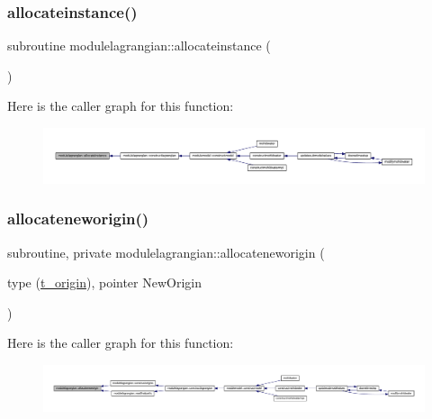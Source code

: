\subsubsection{\texorpdfstring{allocateinstance()}{allocateinstance()}}
{\footnotesize\ttfamily subroutine modulelagrangian\+::allocateinstance (\begin{DoxyParamCaption}{ }\end{DoxyParamCaption})\hspace{0.3cm}{\ttfamily [private]}}

Here is the caller graph for this function\+:\nopagebreak
\begin{figure}[H]
\begin{center}
\leavevmode
\includegraphics[width=350pt]{namespacemodulelagrangian_a8223a77ae9396e4ded8f6f220eb1ebe0_icgraph}
\end{center}
\end{figure}
\mbox{\label{namespacemodulelagrangian_a28216eb4bc7ae29253535daa2e07a0ae}} 
\subsubsection{\texorpdfstring{allocateneworigin()}{allocateneworigin()}}
{\footnotesize\ttfamily subroutine, private modulelagrangian\+::allocateneworigin (\begin{DoxyParamCaption}\item[{type (\mbox{\hyperlink{structmodulelagrangian_1_1t__origin}{t\+\_\+origin}}), pointer}]{New\+Origin }\end{DoxyParamCaption})\hspace{0.3cm}{\ttfamily [private]}}

Here is the caller graph for this function\+:\nopagebreak
\begin{figure}[H]
\begin{center}
\leavevmode
\includegraphics[width=350pt]{namespacemodulelagrangian_a28216eb4bc7ae29253535daa2e07a0ae_icgraph}
\end{center}
\end{figure}
\mbox{\label{namespacemodulelagrangian_aaf265958f7abd87e754e7ff44745bdf0}} 
